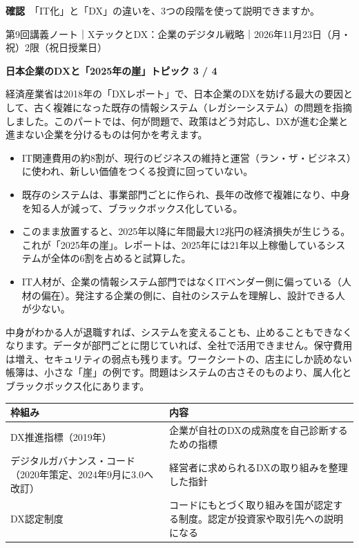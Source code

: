\documentclass[paper=a4paper,fontsize=10pt,line_length=170mm,number_of_lines=46,baselineskip=1.6zw]{jlreq}
\newcommand\topichead[4]{%
  {\sffamily\footnotesize\color{grayt}#1\par}\vspace{1.5mm}
  {\sffamily\bfseries\LARGE #4}\hfill\colorbox{accent}{\sffamily\footnotesize\bfseries トピック #2 / #3}\par
  \vspace{1.2mm}{\color{ink}\hrule height 0.6pt}\vspace{3mm}}
\newcommand\subhead[1]{\par\vspace{2.6mm}{\sffamily\bfseries\large #1}\par\vspace{1.3mm}}
\begin{document}
\begin{checkbox}
{\sffamily\bfseries 確認}　「IT化」と「DX」の違いを、3つの段階を使って説明できますか。\par
\end{checkbox}
\clearpage
\topichead{第9回講義ノート｜XテックとDX：企業のデジタル戦略｜2026年11月23日（月・祝）2限（祝日授業日）}{3}{4}{日本企業のDXと「2025年の崖」}
経済産業省は2018年の「DXレポート」で、日本企業のDXを妨げる最大の要因として、古く複雑になった既存の情報システム（レガシーシステム）の問題を指摘しました。このパートでは、何が問題で、政策はどう対応し、DXが進む企業と進まない企業を分けるものは何かを考えます。\par\vspace{1.2mm}
\subhead{DXレポートが指摘した問題}
\begin{itemize}[leftmargin=1.5em,itemsep=0.6mm,topsep=0.3mm]
\item IT関連費用の約8割が、現行のビジネスの維持と運営（ラン・ザ・ビジネス）に使われ、新しい価値をつくる投資に回っていない。
\item 既存のシステムは、事業部門ごとに作られ、長年の改修で複雑になり、中身を知る人が減って、ブラックボックス化している。
\item このまま放置すると、2025年以降に年間最大12兆円の経済損失が生じうる。これが「2025年の崖」。レポートは、2025年には21年以上稼働しているシステムが全体の6割を占めると試算した。
\item IT人材が、企業の情報システム部門ではなくITベンダー側に偏っている（人材の偏在）。発注する企業の側に、自社のシステムを理解し、設計できる人が少ない。
\end{itemize}\vspace{0.8mm}
\subhead{なぜ「崖」になるのか}
中身がわかる人が退職すれば、システムを変えることも、止めることもできなくなります。データが部門ごとに閉じていれば、全社で活用できません。保守費用は増え、セキュリティの弱点も残ります。ワークシートの、店主にしか読めない帳簿は、小さな「崖」の例です。問題はシステムの古さそのものより、属人化とブラックボックス化にあります。\par\vspace{1.2mm}
\subhead{政策の枠組み}
\begin{center}\small\renewcommand{\arraystretch}{1.15}\setlength{\tabcolsep}{1.5mm}
\begin{tabular}{|p{38.0mm}|p{125.0mm}|}\arrayrulecolor{rulec}\hline
\rowcolor{papertwo}\sffamily\bfseries 枠組み & \sffamily\bfseries 内容\\\hline
DX推進指標（2019年） & 企業が自社のDXの成熟度を自己診断するための指標\\\hline
デジタルガバナンス・コード（2020年策定、2024年9月に3.0へ改訂） & 経営者に求められるDXの取り組みを整理した指針\\\hline
DX認定制度 & コードにもとづく取り組みを国が認定する制度。認定が投資家や取引先への説明になる\\\hline
\end{tabular}\end{center}\vspace{0.5mm}
\end{document}
